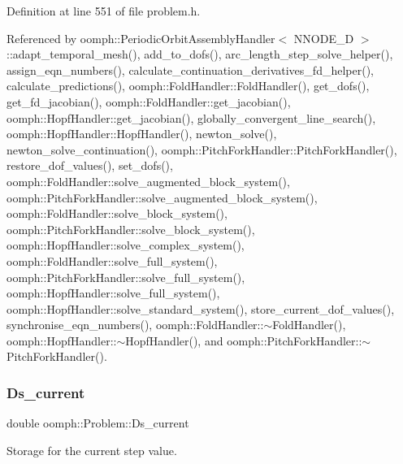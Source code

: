 Definition at line 551 of file problem.\+h.



Referenced by oomph\+::\+Periodic\+Orbit\+Assembly\+Handler$<$ N\+N\+O\+D\+E\+\_\+D $>$\+::adapt\+\_\+temporal\+\_\+mesh(), add\+\_\+to\+\_\+dofs(), arc\+\_\+length\+\_\+step\+\_\+solve\+\_\+helper(), assign\+\_\+eqn\+\_\+numbers(), calculate\+\_\+continuation\+\_\+derivatives\+\_\+fd\+\_\+helper(), calculate\+\_\+predictions(), oomph\+::\+Fold\+Handler\+::\+Fold\+Handler(), get\+\_\+dofs(), get\+\_\+fd\+\_\+jacobian(), oomph\+::\+Fold\+Handler\+::get\+\_\+jacobian(), oomph\+::\+Hopf\+Handler\+::get\+\_\+jacobian(), globally\+\_\+convergent\+\_\+line\+\_\+search(), oomph\+::\+Hopf\+Handler\+::\+Hopf\+Handler(), newton\+\_\+solve(), newton\+\_\+solve\+\_\+continuation(), oomph\+::\+Pitch\+Fork\+Handler\+::\+Pitch\+Fork\+Handler(), restore\+\_\+dof\+\_\+values(), set\+\_\+dofs(), oomph\+::\+Fold\+Handler\+::solve\+\_\+augmented\+\_\+block\+\_\+system(), oomph\+::\+Pitch\+Fork\+Handler\+::solve\+\_\+augmented\+\_\+block\+\_\+system(), oomph\+::\+Fold\+Handler\+::solve\+\_\+block\+\_\+system(), oomph\+::\+Pitch\+Fork\+Handler\+::solve\+\_\+block\+\_\+system(), oomph\+::\+Hopf\+Handler\+::solve\+\_\+complex\+\_\+system(), oomph\+::\+Fold\+Handler\+::solve\+\_\+full\+\_\+system(), oomph\+::\+Pitch\+Fork\+Handler\+::solve\+\_\+full\+\_\+system(), oomph\+::\+Hopf\+Handler\+::solve\+\_\+full\+\_\+system(), oomph\+::\+Hopf\+Handler\+::solve\+\_\+standard\+\_\+system(), store\+\_\+current\+\_\+dof\+\_\+values(), synchronise\+\_\+eqn\+\_\+numbers(), oomph\+::\+Fold\+Handler\+::$\sim$\+Fold\+Handler(), oomph\+::\+Hopf\+Handler\+::$\sim$\+Hopf\+Handler(), and oomph\+::\+Pitch\+Fork\+Handler\+::$\sim$\+Pitch\+Fork\+Handler().

\mbox{\label{classoomph_1_1Problem_ad412d49617d0b0998e5eb440c7a20f3f}} 
\subsubsection{\texorpdfstring{Ds\+\_\+current}{Ds\_current}}
{\footnotesize\ttfamily double oomph\+::\+Problem\+::\+Ds\+\_\+current\hspace{0.3cm}{\ttfamily [protected]}}



Storage for the current step value. 



